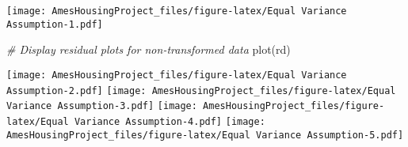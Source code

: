 \documentclass[
]{article}
\newenvironment{Shaded}{\begin{snugshade}}{\end{snugshade}}
\newcommand{\AttributeTok}[1]{\textcolor[rgb]{0.77,0.63,0.00}{#1}}
\newcommand{\CommentTok}[1]{\textcolor[rgb]{0.56,0.35,0.01}{\textit{#1}}}
\newcommand{\ConstantTok}[1]{\textcolor[rgb]{0.00,0.00,0.00}{#1}}
\newcommand{\DecValTok}[1]{\textcolor[rgb]{0.00,0.00,0.81}{#1}}
\newcommand{\FunctionTok}[1]{\textcolor[rgb]{0.00,0.00,0.00}{#1}}
\newcommand{\NormalTok}[1]{#1}
\newcommand{\OtherTok}[1]{\textcolor[rgb]{0.56,0.35,0.01}{#1}}
\newcommand{\SpecialCharTok}[1]{\textcolor[rgb]{0.00,0.00,0.00}{#1}}
\newcommand{\StringTok}[1]{\textcolor[rgb]{0.31,0.60,0.02}{#1}}
\begin{document}
\begin{Shaded}
\end{Shaded}

\texttt{[image: AmesHousingProject\_files/figure-latex/Equal Variance Assumption-1.pdf]}

\begin{Shaded}
\begin{Highlighting}[]
\CommentTok{\# Display residual plots for non{-}transformed data}
\FunctionTok{plot}\NormalTok{(rd)}
\end{Highlighting}
\end{Shaded}

\texttt{[image: AmesHousingProject\_files/figure-latex/Equal Variance Assumption-2.pdf]}
\texttt{[image: AmesHousingProject\_files/figure-latex/Equal Variance Assumption-3.pdf]}
\texttt{[image: AmesHousingProject\_files/figure-latex/Equal Variance Assumption-4.pdf]}
\texttt{[image: AmesHousingProject\_files/figure-latex/Equal Variance Assumption-5.pdf]}
\end{document}
